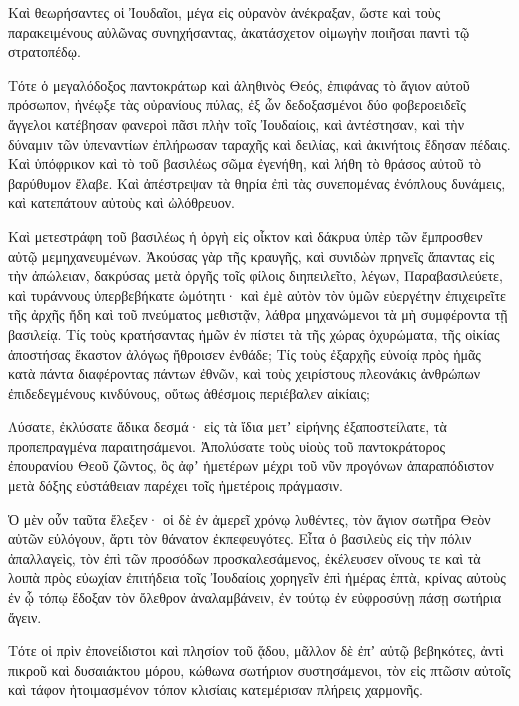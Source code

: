 {Καὶ θεωρήσαντες οἱ Ἰουδαῖοι, μέγα εἰς οὐρανὸν ἀνέκραξαν, ὥστε καὶ τοὺς παρακειμένους αὐλῶνας συνηχήσαντας, ἀκατάσχετον οἰμωγὴν ποιῆσαι παντὶ τῷ στρατοπέδῳ.
\par }{\PP {}Τότε ὁ μεγαλόδοξος παντοκράτωρ καὶ ἀληθινὸς Θεός, ἐπιφάνας τὸ ἅγιον αὐτοῦ πρόσωπον, ἠνέῳξε τὰς οὐρανίους πύλας, ἐξ ὧν δεδοξασμένοι δύο φοβεροειδεῖς ἄγγελοι κατέβησαν φανεροὶ πᾶσι πλὴν τοῖς Ἰουδαίοις,
καὶ ἀντέστησαν, καὶ τὴν δύναμιν τῶν ὑπεναντίων ἐπλήρωσαν ταραχῆς καὶ δειλίας, καὶ ἀκινήτοις ἔδησαν πέδαις.
Καὶ ὑπόφρικον καὶ τὸ τοῦ βασιλέως σῶμα ἐγενήθη, καὶ λήθη τὸ θράσος αὐτοῦ τὸ βαρύθυμον ἔλαβε.
Καὶ ἀπέστρεψαν τὰ θηρία ἐπὶ τὰς συνεπομένας ἐνόπλους δυνάμεις, καὶ κατεπάτουν αὐτοὺς καὶ ὠλόθρευον.
\par }{\PP {}Καὶ μετεστράφη τοῦ βασιλέως ἡ ὀργὴ εἰς οἶκτον καὶ δάκρυα ὑπὲρ τῶν ἔμπροσθεν αὐτῷ μεμηχανευμένων.
Ἀκούσας γὰρ τῆς κραυγῆς, καὶ συνιδὼν πρηνεῖς ἅπαντας εἰς τὴν ἀπώλειαν, δακρύσας μετὰ ὀργῆς τοῖς φίλοις διηπειλεῖτο, λέγων,
Παραβασιλεύετε, καὶ τυράννους ὑπερβεβήκατε ὠμότητι· καὶ ἐμὲ αὐτὸν τὸν ὑμῶν εὐεργέτην ἐπιχειρεῖτε τῆς ἀρχῆς ἤδη καὶ τοῦ πνεύματος μεθιστᾷν, λάθρα μηχανώμενοι τὰ μὴ συμφέροντα τῇ βασιλείᾳ.
Τίς τοὺς κρατήσαντας ἡμῶν ἐν πίστει τὰ τῆς χώρας ὀχυρώματα, τῆς οἰκίας ἀποστήσας ἕκαστον ἀλόγως ἤθροισεν ἐνθάδε;
Τίς τοὺς ἐξαρχῆς εὐνοίᾳ πρὸς ἡμᾶς κατὰ πάντα διαφέροντας πάντων ἐθνῶν, καὶ τοὺς χειρίστους πλεονάκις ἀνθρώπων ἐπιδεδεγμένους κινδύνους, οὕτως ἀθέσμοις περιέβαλεν αἰκίαις;
\par }{\PP {}Λύσατε, ἐκλύσατε ἄδικα δεσμά· εἰς τὰ ἴδια μετʼ εἰρήνης ἐξαποστείλατε, τὰ προπεπραγμένα παραιτησάμενοι.
Ἀπολύσατε τοὺς υἱοὺς τοῦ παντοκράτορος ἐπουρανίου Θεοῦ ζῶντος, ὃς ἀφʼ ἡμετέρων μέχρι τοῦ νῦν προγόνων ἀπαραπόδιστον μετὰ δόξης εὐστάθειαν παρέχει τοῖς ἡμετέροις πράγμασιν.
\par }{\PP {}Ὁ μὲν οὖν ταῦτα ἔλεξεν· οἱ δὲ ἐν ἀμερεῖ χρόνῳ λυθέντες, τὸν ἅγιον σωτῆρα Θεὸν αὐτῶν εὐλόγουν, ἄρτι τὸν θάνατον ἐκπεφευγότες.
Εἶτα ὁ βασιλεὺς εἰς τὴν πόλιν ἀπαλλαγεὶς, τὸν ἐπὶ τῶν προσόδων προσκαλεσάμενος, ἐκέλευσεν οἴνους τε καὶ τὰ λοιπὰ πρὸς εὐωχίαν ἐπιτήδεια τοῖς Ἰουδαίοις χορηγεῖν ἐπὶ ἡμέρας ἑπτὰ, κρίνας αὐτοὺς ἐν ᾧ τόπῳ ἔδοξαν τὸν ὄλεθρον ἀναλαμβάνειν, ἐν τούτῳ ἐν εὐφροσύνῃ πάσῃ σωτήρια ἄγειν.
\par }{\PP {}Τότε οἱ πρὶν ἐπονείδιστοι καὶ πλησίον τοῦ ᾅδου, μᾶλλον δὲ ἐπʼ αὐτῷ βεβηκότες, ἀντὶ πικροῦ καὶ δυσαιάκτου μόρου, κώθωνα σωτήριον συστησάμενοι, τὸν εἰς πτῶσιν αὐτοῖς καὶ τάφον ἡτοιμασμένον τόπον κλισίαις κατεμέρισαν πλήρεις χαρμονῆς.
}
